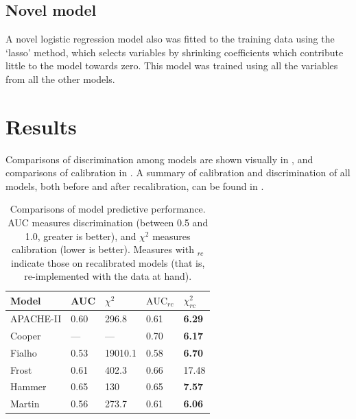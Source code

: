 \documentclass[onecolumn]{article}
\begin{document}
\subsection{Novel model}

A novel logistic regression model also was fitted to the training data using the `lasso' method, which selects variables by shrinking coefficients which contribute little to the model towards zero. This model was trained using all the variables from all the other models.

\section{Results}

Comparisons of discrimination among models are shown visually in , and comparisons of calibration in . A summary of calibration and discrimination of all models, both before and after recalibration, can be found in .

\begin{table}[hb]
\centering
	\renewcommand{\arraystretch}{1.4}
		\caption{Comparisons of model predictive performance. AUC measures discrimination (between 0.5 and 1.0, greater is better), and $\chi^{2}$ measures calibration (lower is better). Measures with $_{rc}$ indicate those on recalibrated models (that is, re-implemented with the data at hand).}%
		\begin{tabular}{lllll}
		\hline
		Model & AUC & $ \chi^{2} $ & $ \mathrm{AUC}_{rc} $ & $ \chi^{2}_{rc} $\\
		\hline
		APACHE-II & 0.60 & 296.8 & 0.61 & \textbf{6.29}\\
		Cooper & --- & --- & 0.70 & \textbf{6.17}\\
		Fialho & 0.53 & 19010.1 & 0.58 & \textbf{6.70}\\
		Frost & 0.61 & 402.3 & 0.66 & 17.48\\
		Hammer & 0.65 & 130 & 0.65 & \textbf{7.57}\\
		Martin & 0.56 & 273.7 & 0.61 & \textbf{6.06}\\
		\hline
		\end{tabular}
	\label{ModelComparisonTable}
\end{table}
\end{document}
